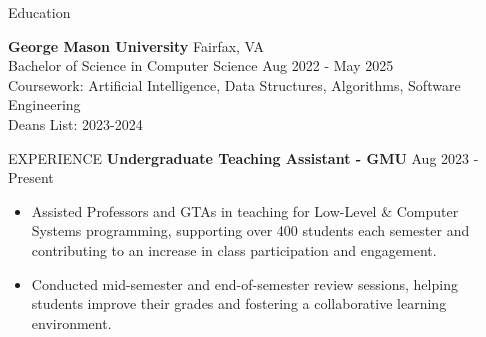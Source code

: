 \documentclass{resume} %
\begin{document}
\vspace{-0.5em}
\begin{rSection}{Education}

{\bf George Mason University} \hfill {Fairfax, VA}\\
Bachelor of Science in Computer Science \hfill{Aug 2022 - May 2025}\\
Coursework: Artificial Intelligence, Data Structures, Algorithms, Software Engineering\\
Deans List: 2023-2024
\end{rSection}

\begin{rSection}{EXPERIENCE}
\textbf{Undergraduate Teaching Assistant - GMU} \hfill Aug 2023 - Present
 \begin{itemize}
    \itemsep -3pt {}
     \item Assisted Professors and GTAs in teaching for Low-Level \& Computer Systems programming, supporting over 400 students each semester and contributing to an increase in class participation and engagement.
     \item Conducted mid-semester and end-of-semester review sessions, helping students improve their grades and fostering a collaborative learning environment.
 \end{itemize}

\end{rSection} 
\end{document}
